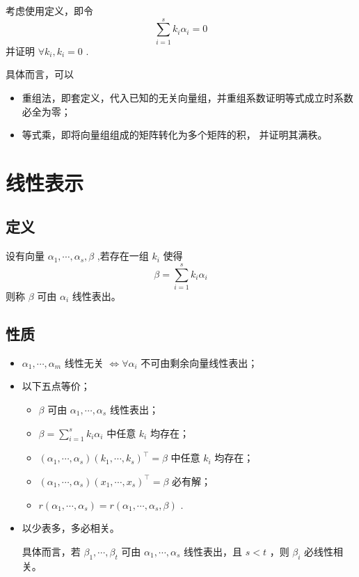 
考虑使用定义，即令$$
    \sum_{i=1}^s k_i\alpha_i = 0
$$ 
并证明 $ \forall k_i, k_i = 0 $ .

具体而言，可以
\begin{itemize}
    \item 重组法，即套定义，代入已知的无关向量组，并重组系数证明等式成立时系数必全为零；
    \item 等式乘，即将向量组组成的矩阵转化为多个矩阵的积，
    并证明其满秩。
\end{itemize}

\section{线性表示}

\subsection{定义}

设有向量 $ \alpha_1,\cdots,\alpha_s,\beta $ ,若存在一组 $ k_i $ 使得
$$
    \beta = \sum_{i = 1}^s k_i\alpha_i
$$ 
则称 $ \beta $ 可由 $ \alpha_i $ 线性表出。

\subsection{性质}

\begin{itemize}
    \item $ \alpha_1,\cdots,\alpha_m $ 线性无关
        $ \Leftrightarrow \forall \alpha_i $ 不可由剩余向量线性表出；
    \item 以下五点等价；
    \begin{itemize}
        \item $ \beta $ 可由 $ \alpha_1,\cdots,\alpha_s $ 线性表出；
        \item $ \beta = \sum_{i = 1}^s k_i\alpha_i $ 中任意 $ k_i $ 均存在；
        \item $ (\alpha_1,\cdots,\alpha_s)(k_1,\cdots,k_s)^\top = \beta $ 中任意 $ k_i $ 均存在；
        \item $ (\alpha_1,\cdots,\alpha_s)(x_1,\cdots,x_s)^\top = \beta $ 必有解；
        \item $ r(\alpha_1,\cdots,\alpha_s) = r(\alpha_1,\cdots,\alpha_s,\beta) $ .
    \end{itemize}
    \item 以少表多，多必相关。
    
    具体而言，若 $ \beta_1,\cdots,\beta_t $ 可由 $ \alpha_1,\cdots,\alpha_s $ 
    线性表出，且 $ s<t $ ，则 $ \beta_i $ 必线性相关。
\end{itemize}

